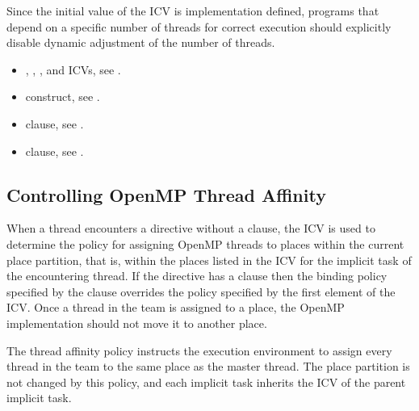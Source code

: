 \begin{note}
Since the initial value of the  ICV is implementation defined, programs
that depend on a specific number of threads for correct execution should explicitly
disable dynamic adjustment of the number of threads.
\end{note}

\crossreferences
\begin{itemize}

\item {}, , , and 
 ICVs, see .

\item {} construct, see .

\item {} clause, see .

\item {} clause, see .
\end{itemize}



\subsection{Controlling OpenMP Thread Affinity}
\label{subsec:Controlling OpenMP Thread Affinity}

When a thread encounters a  directive without a  
clause, the  ICV is used to determine the policy for assigning 
OpenMP threads to places within the current place partition, that is, within
the places listed in the  ICV for the implicit task
of the encountering thread.
If the  directive has a  clause then the 
binding policy specified by the  clause overrides the policy 
specified by the first element of the  ICV. Once a thread in the 
team is assigned to a place, the OpenMP implementation should not move it to 
another place.

The  thread affinity policy instructs the execution environment to 
assign every thread in the team to the same place as the master thread. The place 
partition is not changed by this policy, and each implicit task inherits the 
 ICV of the parent implicit task.

